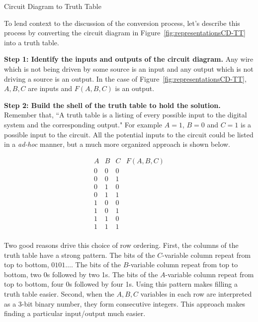 \begin{process}{Circuit Diagram to Truth Table}
    \label{process:representationCDtoTT}
    \label{page:representationCDtoTT}

    To lend context to the discussion of the conversion process, let's describe this
    process by converting the circuit diagram in Figure~\ref{fig:representationsCD-TT}
    into a truth table.

    \textbf{Step 1:  Identify the inputs and outputs of the circuit diagram.}
    Any wire which is not being driven by some source is an input and
    any output which is not driving a source is an output.  In the case of
    Figure~\ref{fig:representationsCD-TT}, $A,B,C$ are inputs and $F(A,B,C)$ is an output.

    \textbf{Step 2: Build the shell of the truth table to hold the solution. }
    Remember that, ``A truth table is a listing of every possible  input to the
    digital system and the corresponding output."  For example $A=1$, $B=0$ and
    $C=1$ is a possible input to the circuit.  All the
    potential inputs to the circuit could be listed in a \textit{ad-hoc}
    manner, but a much more organized approach is shown below.

    \label{page:TTshell}
    $$
    \begin{array}{c|c|c||c}
        A & B & C & F(A,B,C) \\ \hline \hline
        0 & 0 & 0 &   \\ \hline
        0 & 0 & 1 &   \\ \hline
        0 & 1 & 0 &   \\ \hline
        0 & 1 & 1 &   \\ \hline
        1 & 0 & 0 &   \\ \hline
        1 & 0 & 1 &   \\ \hline
        1 & 1 & 0 &   \\ \hline
        1 & 1 & 1 &   \\
    \end{array}$$

    Two good reasons drive this choice of row ordering.
    First, the columns of the truth table have a strong pattern.
    The bits of the $C$-variable column repeat from top to bottom, $0 1 0 1 \ldots$.
    The bits of the $B$-variable column repeat from top to bottom, two 0s followed by two 1s.
    The bits of the $A$-variable column repeat from top to bottom, four 0s followed by four 1s.
    Using this pattern makes filling a truth table easier.  Second,
    when the $A,B,C$ variables in each row are interpreted as a
    3-bit binary number, they form consecutive integers.  This approach
    makes finding a particular input/output much easier.


\end{process}
